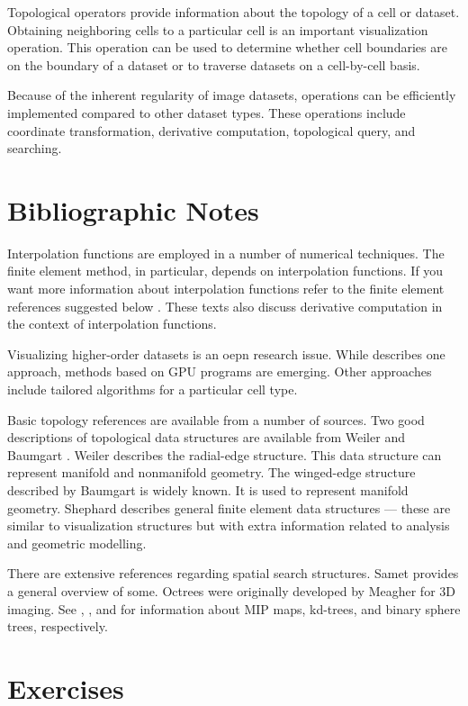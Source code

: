 Topological operators provide information about the topology of a cell or dataset. Obtaining neighboring cells to a particular cell is an important visualization operation. This operation can be used to determine whether cell boundaries are on the boundary of a dataset or to traverse datasets on a cell-by-cell basis.

Because of the inherent regularity of image datasets, operations can be efficiently implemented compared to other dataset types. These operations include coordinate transformation, derivative computation, topological query, and searching.

\section{Bibliographic Notes}
\label{bibnote:advanced_data_representation}

Interpolation functions are employed in a number of numerical techniques. The finite element method, in particular, depends on interpolation functions. If you want more information about interpolation functions refer to the finite element references suggested below \cite{Cook89} \cite{Gallagher75} \cite{Zienkiewicz87}. These texts also discuss derivative computation in the context of interpolation functions.

Visualizing higher-order datasets is an oepn research issue. While \cite{Schroeder06} describes one approach, methods based on GPU programs are emerging. Other approaches include tailored algorithms for a particular cell type.

Basic topology references are available from a number of sources. Two good descriptions of topological data structures are available from Weiler \cite{Weiler86} \cite{Weiler88} and Baumgart \cite{Baumgart74}. Weiler describes the radial-edge structure. This data structure can represent manifold and nonmanifold geometry. The winged-edge structure described by Baumgart is widely known. It is used to represent manifold geometry. Shephard \cite{Shephard88} describes general finite element data structures — these are similar to visualization structures but with extra information related to analysis and geometric modelling.

There are extensive references regarding spatial search structures. Samet \cite{Samet90} provides a general overview of some. Octrees were originally developed by Meagher \cite{Meagher82} for 3D imaging. See \cite{Williams83}, \cite{Bentley75}, and \cite{Quinlan94} for information about MIP maps, kd-trees, and binary sphere trees, respectively.

\printbibliography


\section{Exercises}
